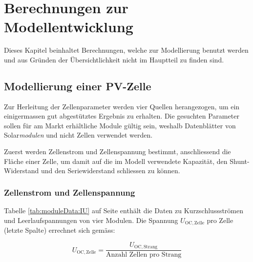 \chapter{Berechnungen zur Modellentwicklung}
\label{app:models:calcs}

Dieses Kapitel beinhaltet Berechnungen, welche zur Modellierung benutzt werden
und aus Gr\"unden der \"Ubersichtlichkeit nicht im Hauptteil zu finden sind.


\section{Modellierung einer PV-Zelle}
\label{app:models:develop:cell}

Zur  Herleitung  der  Zellenparameter  werden vier  Quellen  herangezogen,  um
ein  einigermassen  gut  abgest\"utztes Ergebnis  zu  erhalten. Die  gesuchten
Parameter sollen  f\"ur am Markt  erh\"altliche Module g\"ultig  sein, weshalb
Datenbl\"atter von Solar\emph{modulen} und nicht Zellen verwendet werden.

Zuerst  werden  Zellenstrom  und Zellenspannung  bestimmt,  anschliessend  die
Fl\"ache einer Zelle,  um damit auf die im Modell  verwendete Kapazit\"at, den
Shunt-Widerstand und den Seriewiderstand schliessen zu k\"onnen.


\subsection{Zellenstrom und Zellenspannung}
\label{app:subsec:cell:UI}

Tabelle   \ref{tab:moduleData:IU}    auf   Seite   \pageref{tab:moduleData:IU}
enth\"alt die  Daten zu  Kurzschlussstr\"omen und Leerlaufspannungen  von vier
Modulen. Die  Spannung  $U_{\mathrm{OC,  Zelle}}$ pro  Zelle  (letzte  Spalte)
errechnet sich gem\"ass:

\begin{equation}
    \label{eq:voltagePerCell}
    U_{\mathrm{OC, Zelle}} = \frac{U_{\mathrm{OC, Strang}}}{\text{Anzahl Zellen pro Strang}}
\end{equation}

